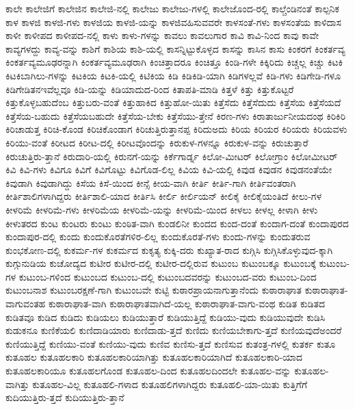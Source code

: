 {ಕಾಲೇ
ಕಾಲೇಜಿಗೆ
ಕಾಲೇಜಿನ
ಕಾಲೇಜಿ-ನಲ್ಲಿ
ಕಾಲೇಜು
ಕಾಲೇಜು-ಗಳಲ್ಲಿ
ಕಾಲೇಜೊಂದ-ರಲ್ಲಿ
ಕಾಲ್ಚೆಂಡಿನಂತೆ
ಕಾಲ್ಪನಿಕ
ಕಾಳ
ಕಾಳಜಿ
ಕಾಳಜಿ-ಗಳು
ಕಾಳಜಿಯ
ಕಾಳಜಿ-ಯನ್ನು
ಕಾಳಜಿವಹಿಸುವವರೇ
ಕಾಳಸಂತೆ-ಗಳು
ಕಾಳಸಂತೆಯ
ಕಾಳಿದಾಸ
ಕಾಳೀ
ಕಾಳೀಪದ
ಕಾಳೀಪದ-ನಲ್ಲಿ
ಕಾಳು
ಕಾಳು-ಗಳನ್ನು
ಕಾವಲು
ಕಾವಲುಗಾರ
ಕಾವಿ
ಕಾವಿ-ನಿಂದ
ಕಾವು
ಕಾವೇ
ಕಾವ್ಯಗಳದ್ದು
ಕಾವ್ಯ-ವನ್ನು
ಕಾಶಿಗೆ
ಕಾಶಿಯ
ಕಾಶಿ-ಯಲ್ಲಿ
ಕಾಸನ್ನಿಟ್ಟುಕೊಳ್ಳದ
ಕಾಸನ್ನು
ಕಾಸಿನ
ಕಾಸು
ಕಿಂಕರಗೆ
ಕಿಂಕರ್ತವ್ಯ
ಕಿಂಕರ್ತವ್ಯಮೂಢರನ್ನಾಗಿ
ಕಿಂಕರ್ತವ್ಯಮೂಢರಾಗಿ
ಕಿಂಚಿತ್ತಾದರೂ
ಕಿಂಚಿತ್ತೂ
ಕಿಂಡಿ-ಗಳೇ
ಕಿಕ್ಕಿರಿದು
ಕಿಚ್ಚಲ್ಲ
ಕಿಚ್ಚು
ಕಿಟಕಿ
ಕಿಟಕಿಬಾಗಿಲು-ಗಳನ್ನು
ಕಿಟಕಿಯ
ಕಿಟಕಿ-ಯಲ್ಲಿ
ಕಿಟಿಕಿಯ
ಕಿಡಿ
ಕಿಡಿಕಿಡಿ-ಯಾಗಿ
ಕಿಡಿಗಳಲ್ಲವೆ
ಕಿಡಿ-ಗಳು
ಕಿಡಿಗೇಡಿ-ಗಳೂ
ಕಿಡಿಗೇಡಿತನಇವೆಲ್ಲವೂ
ಕಿಡಿ-ಯನ್ನು
ಕಿಡಿಯಾದುದ-ರಿಂದ
ಕಿತಾಪತಿ-ಮಾಡಿ
ಕಿತ್ತಳೆ
ಕಿತ್ತು
ಕಿತ್ತುಕೊಟ್ಟರೆ
ಕಿತ್ತುಕೊಳ್ಳಬಹುದೆಂಬ
ಕಿತ್ತುಬರು-ವಂತೆ
ಕಿತ್ತುಹಾಕಿದ
ಕಿತ್ತುಹೋ-ಯಿತು
ಕಿತ್ತೆಸೆದು
ಕಿತ್ತೆಸೆದುದು
ಕಿತ್ತೆಸೆಯ
ಕಿತ್ತೆಸೆಯದೆ
ಕಿತ್ತೆಸೆಯ-ಬಹುದು
ಕಿತ್ತೆಸೆಯಬಹುದೇ
ಕಿತ್ತೆಸೆಯ-ಬೇಕು
ಕಿತ್ತೆಸೆಯು-ತ್ತೇನೆ
ಕಿರಣ-ಗಳು
ಕಿರಾತಾರ್ಜುನೀಯದಂಥ
ಕಿರಿಕಿರಿ
ಕಿರಿಚಾಡುತ್ತ
ಕಿರಿಚಿ-ಕೊಂಡ
ಕಿರಿಚಿಕೊಂಡಾಗ
ಕಿರಿಚುತ್ತಿರುತ್ತಾನಪ್ಪ
ಕಿರಿದುಅದು
ಕಿರಿಯ
ಕಿರಿಯರ
ಕಿರಿಯರು
ಕಿರಿಯವಳು
ಕಿರಿಯು-ವಂತೆ
ಕಿರೀಟದ
ಕಿರೀಟ-ದಲ್ಲಿ
ಕಿರೀಟವೊಂದನ್ನು
ಕಿರುಕುಳ-ಗಳನ್ನೂ
ಕಿರುಕುಳ-ವನ್ನು
ಕಿರುಚುತ್ತಾರೆ
ಕಿರುಚುತ್ತಿರು-ತ್ತಾನೆ
ಕಿರುದಾರಿ-ಯಲ್ಲಿ
ಕಿರುನಗೆ-ಯನ್ನು
ಕಿರ್ಕೆಗಾರ್ಡ್ನ
ಕಿಲೋ-ಮೀಟರ್
ಕಿಲೋಗ್ರಾಂ
ಕಿಲೋಮೀಟರ್
ಕಿವಿ
ಕಿವಿ-ಗಳು
ಕಿವಿಗೂ
ಕಿವಿಗೆ
ಕಿವಿಗೊಟ್ಟು
ಕಿವಿಗೊಡ-ಲಿಲ್ಲ
ಕಿವಿಯ
ಕಿವಿ-ಯಲ್ಲಿ
ಕಿವುಡ
ಕಿವುಡನ
ಕಿವುಡನಂತೆಯೇ
ಕಿವುಡಾಗಿ
ಕಿವುಡಾಗಿದ್ದು
ಕಿಸೆಯ
ಕಿಸೆ-ಯಿಂದ
ಕೀನ್ಸೆ
ಕೀಯ-ವಾಗಿ
ಕೀರ್ತಿ
ಕೀರ್ತಿ-ಗಾಗಿ
ಕೀರ್ತಿವಂತರಾಗಿ
ಕೀರ್ತಿಶಾಲಿಗಳಾಗಿದ್ದರು
ಕೀರ್ತಿಶಾಲಿ-ಯಾದ
ಕೀರ್ತಿಸಿ
ಕೀರ್ಲಿ
ಕೀರ್ಲಿಯನ್
ಕೀಲಿಕೈ
ಕೀಲಿಕೈಯಂತಿದೆ
ಕೀಲು-ಗಳ
ಕೀಳರಿಮೆ
ಕೀಳರಿಮೆ-ಗಳು
ಕೀಳರಿಮೆಯ
ಕೀಳರಿಮೆ-ಯನ್ನು
ಕೀಳರಿಮೆ-ಯಿಂದ
ಕೀಳಲು
ಕೀಳಲ್ಲ
ಕೀಳಾಗಿ
ಕೀಳು
ಕೀಳುತರದ
ಕುಂಟ
ಕುಂಟರು
ಕುಂಟು
ಕುಂಠಿತ-ವಾಗಿ
ಕುಂಡಲಿನೀ
ಕುಂದದ
ಕುಂದ-ದಂತೆ
ಕುಂದಾಗ-ದಂತೆ
ಕುಂದಾಪುರದ
ಕುಂದಾಪುರ-ದಲ್ಲಿ
ಕುಂದು
ಕುಂದುಕೊರತೆಗಳಿರ-ಲಿಲ್ಲ
ಕುಂದುಕೊರತೆ-ಗಳು
ಕುಂದು-ಗಳನ್ನು
ಕುಂದುತರುವ
ಕುಂಭಕೋಣ-ದಲ್ಲಿ
ಕುಕರ್ಮ-ಗಳ
ಕುಕರ್ಮದ
ಕುಕೃತ್ಯ
ಕುಕ್ಕಿ-ದರು
ಕುಖ್ಯಾತ-ರಾದ
ಕುಗ್ಗಿಸಿ
ಕುಗ್ಗಿಸಿಕೊಳ್ಳುವುದ-ಕ್ಕಾಗಿ
ಕುಗ್ಗುನುಡಿಯ
ಕುಚೋದ್ಯದ
ಕುಟೀರ
ಕುಟೀರ-ದಲ್ಲಿ
ಕುಟೀರ-ದಲ್ಲಿರುವ
ಕುಟುಂಬ
ಕುಟುಂಬಕ್ಕೂ
ಕುಟುಂಬಕ್ಕೆ
ಕುಟುಂಬ-ಗಳ
ಕುಟುಂಬ-ಗಳಿಂದ
ಕುಟುಂಬದ
ಕುಟುಂಬ-ದಲ್ಲಿ
ಕುಟುಂಬದವರನ್ನು
ಕುಟುಂಬದ-ವರು
ಕುಟುಂಬ-ದಿಂದ
ಕುಟುಂಬನಾಶ
ಕುಟುಂಬರಕ್ಷಣೆ-ಗಾಗಿ
ಕುಟುಂಬವೇ
ಕುಟ್ಟಿ
ಕುಠಾರಪ್ರಾಯನಾಗುತ್ತಾನೆಂದು
ಕುಠಾರಾಘಾತ
ಕುಠಾರಾಘಾತ-ವಾಗುವಂತಹ
ಕುಠಾರಾಘಾತ-ವಾಗಿ
ಕುಠಾರಾಘಾತವಾಗಿದೆ-ಯಲ್ಲ
ಕುಠಾರಾಘಾತ-ವಾಗು-ವಂಥ
ಕುಡಿತ
ಕುಡಿತದ
ಕುಡಿತವೂ
ಕುಡಿದ
ಕುಡಿದು
ಕುಡಿಯಲು
ಕುಡಿಯುತ್ತಾರೆ
ಕುಡಿಯುತ್ತಿದ್ದೆ
ಕುಡಿಯು-ವುದು
ಕುಡಿಯುವುದೇ
ಕುಡಿಸಿ
ಕುಡುಕನೂ
ಕುಣಿಕೆಯಲಿ
ಕುಣಿದಾಡಿಯಾರು
ಕುಣಿದಾಡು-ತ್ತದೆ
ಕುಣಿದು
ಕುಣಿಯಬೇಕಾಗು-ತ್ತದೆ
ಕುಣಿಯವುದೆಅಂದರೆ
ಕುಣಿಯುತ್ತಿದ್ದೆ
ಕುಣಿಯು-ವಂತೆ
ಕುಣಿಯು-ವುದು
ಕುಣಿವ
ಕುಣಿಸು-ತ್ತದೆ
ಕುಣಿಸುವ
ಕುತಂತ್ರ-ಗಳಲ್ಲಿ
ಕುತರ್ಕ
ಕುತೂ
ಕುತೂಹಲ
ಕುತೂಹಲಕಾರಿ
ಕುತೂಹಲಕಾರಿಯಾಗಿತ್ತು
ಕುತೂಹಲಕಾರಿಯಾಗಿದೆ
ಕುತೂಹಲಕಾರಿ-ಯಾದ
ಕುತೂಹಲಕಾರಿಯೂ
ಕುತೂಹಲಗೊಂಡ
ಕುತೂಹಲ-ದಿಂದ
ಕುತೂಹಲದಿಂದಲೇ
ಕುತೂಹಲ-ವನ್ನು
ಕುತೂಹಲ-ವಾಗಿತ್ತು
ಕುತೂಹಲ-ವಿಲ್ಲ
ಕುತೂಹಲಿ-ಗಳಾದ
ಕುತೂಹಲಿಗಳಾಗಿದ್ದರು
ಕುತೂಹಲಿ-ಯಾ-ಯಿತು
ಕುತ್ತಿಗೆಗೆ
ಕುದಿಯುತ್ತಿರು-ತ್ತದೆ
ಕುದಿಯುತ್ತಿರು-ತ್ತಾನೆ
}
